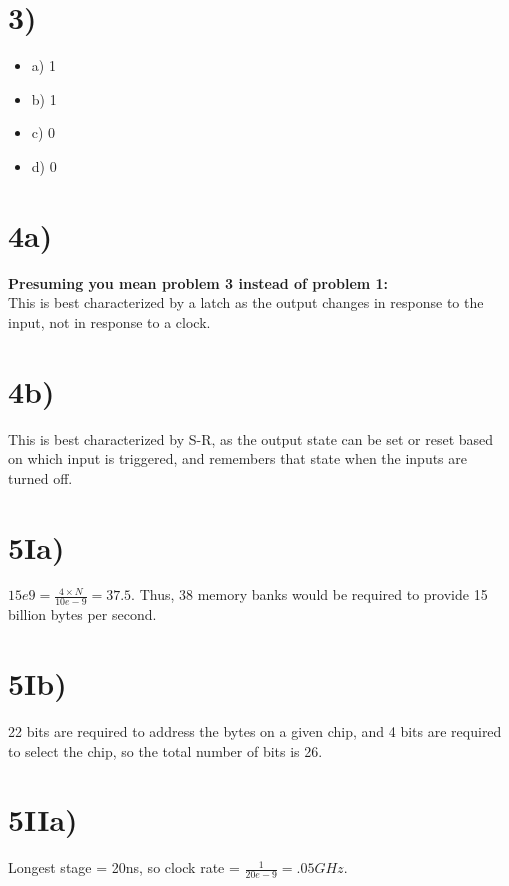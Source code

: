 \documentclass[a4paper,11pt]{article}
\begin{document}

\section*{3)}
  
\begin{itemize}
  \item a) 1
  \item b) 1
  \item c) 0
  \item d) 0
\end{itemize}


\section*{4a)}
{\bf Presuming you mean problem 3 instead of problem 1:}\\

\noindent This is best characterized by a latch as the output changes in
response to the input, not in response to a clock. 


\section*{4b)}
This is best characterized by S-R, as the output state can be set or reset
based on which input is triggered, and remembers that state when the inputs
are turned off.  


\section*{5Ia)}
$15e9 = \frac{4 \times N}{10e-9} = 37.5$.  Thus, 38 memory banks would be
required to provide 15 billion bytes per second.

\section*{5Ib)}
22 bits are required to address the bytes on a given chip, and 4 bits are 
required to select the chip, so the total number of bits is 26.


\section*{5IIa)}
Longest stage = 20ns, so clock rate = $\frac{1}{20e-9} = .05GHz$.
\end{document}
